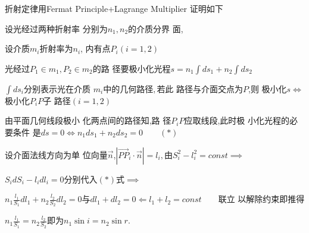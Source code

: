 \documentclass{ctexart}
\begin{document}
折射定律用Fermat Principle+Lagrange Multiplier 
证明如下

设光经过两种折射率%
分别为$n_{1},n_{2}$的介质分界%
面,

设介质$m_{i}$折射率为$n_{i}$,%
内有点$P_{i}\left( i=1,2\right) $

光经过$P_{1}\in m_{1},P_{2}\in m_{2}$的路%
径要极小化光程$s=n_{1}\int
ds_{1}+n_{2}\int ds_{2}$

$\int ds_{i}$分别表示光在介质%
$m_{i}$中的几何路径$,$若此%
路径与介面交点为$P$,则%
极小化$s\iff $极小化$P_{i}P$子%
路径$\left( i=1,2\right) $

由平面几何线段极小%
化两点间的路径知,路%
径$P_{i}P$应取线段,此时极%
小化光程的必要条件%
是$ds=0\iff n_{1}ds_{1}+n_{2}ds_{2}=0\qquad \left( \ast \right) $

设介面法线方向为单%
位向量$\vec{n}$,$\left\vert \overrightarrow{PP}_{i}\cdot 
\vec{n}\right\vert =l_{i},$由$S_{i}^{2}-l_{i}^{2}=const\implies $

$S_{i}dS_{i}-l_{i}dl_{i}=0$分别代入$\left( \ast
\right) $式$\implies $

$n_{1}\frac{l_{1}}{S_{1}}dl_{1}+n_{2}\frac{l_{2}}{S_{2}}dl_{2}=0$与$%
dl_{1}+dl_{2}=0\Longleftarrow l_{1}+l_{2}=const\qquad $联立%
以解除约束即推得

$n_{1}\frac{l_{1}}{S_{1}}=n_{2}\frac{l_{2}}{S_{2}}$即为$%
n_{1}\sin i=n_{2}\sin r.$
\end{document}
